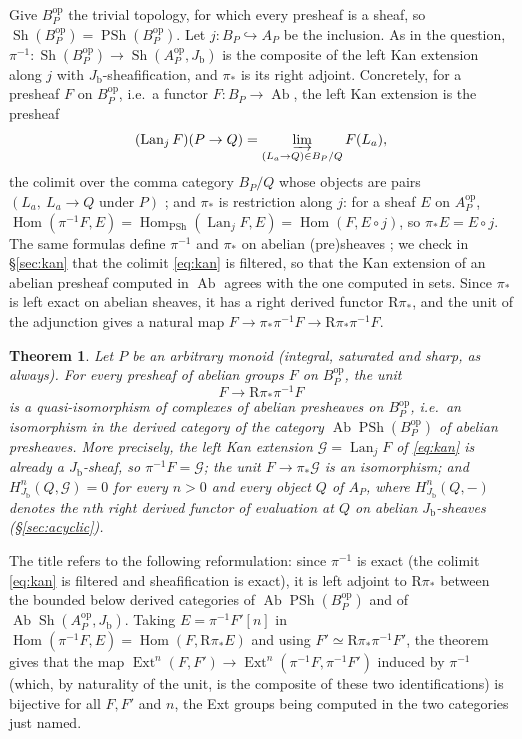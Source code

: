 \documentclass[12pt]{article}
\newcommand{\Hom}{\operatorname{Hom}}
\newcommand{\Sh}{\operatorname{Sh}}
\newcommand{\PSh}{\operatorname{PSh}}
\newcommand{\Ab}{\operatorname{Ab}}
\newcommand{\R}{\mathrm R}
\newcommand{\Jb}{J_{\mathrm b}}
\newcommand{\G}{\mathcal G}
\newcommand{\Lan}{\operatorname{Lan}}
\newtheorem{theorem}{Theorem}[section]
\theoremstyle{definition}
\theoremstyle{remark}
\begin{document}
Give \(B_P^{\mathrm{op}}\) the trivial topology, for which every presheaf is a
sheaf, so \(\Sh(B_P^{\mathrm{op}})=\PSh(B_P^{\mathrm{op}})\).  Let
\(j:B_P\hookrightarrow A_P\) be the inclusion.  As in the question,
\(\pi^{-1}:\Sh(B_P^{\mathrm{op}})\to\Sh(A_P^{\mathrm{op}},\Jb)\) is the
composite of the left Kan extension along \(j\) with \(\Jb\)-sheafification,
and \(\pi_*\) is its right adjoint.  Concretely, for a presheaf \(F\) on
\(B_P^{\mathrm{op}}\), i.e.\ a functor \(F:B_P\to\Ab\), the left Kan extension
is the presheaf
\begin{equation}
  (\Lan_jF)(P\to Q)
   =\varinjlim_{(L_a\to Q)\in B_P/Q}F(L_a),
  \label{eq:kan}
\end{equation}
the colimit over the comma category \(B_P/Q\) whose objects are pairs
\((L_a,\ L_a\to Q\text{ under }P)\) \cite[Tags 00VC, 00VE]{stacks}; and
\(\pi_*\) is restriction along \(j\): for a sheaf \(E\) on
\(A_P^{\mathrm{op}}\),
\(\Hom(\pi^{-1}F,E)=\Hom_{\PSh}(\Lan_jF,E)=\Hom(F,E\circ j)\), so
\(\pi_*E=E\circ j\).  The same formulas define \(\pi^{-1}\) and \(\pi_*\) on
abelian (pre)sheaves \cite[Tag 00VF]{stacks}; we check in \S\ref{sec:kan}
that the colimit
\eqref{eq:kan} is filtered, so that the Kan extension of an abelian presheaf
computed in \(\Ab\) agrees with the one computed in sets.  Since \(\pi_*\) is
left exact on abelian sheaves, it has a right derived functor \(\R\pi_*\),
and the unit of the adjunction gives a natural map
\(F\to\pi_*\pi^{-1}F\to\R\pi_*\pi^{-1}F\).

\begin{theorem}\label{thm:main}
Let \(P\) be an arbitrary monoid (integral, saturated and sharp, as
always).  For every presheaf of
abelian groups \(F\) on \(B_P^{\mathrm{op}}\), the unit
\[
             F\longrightarrow \R\pi_*\pi^{-1}F
\]
is a quasi-isomorphism of complexes of abelian presheaves on
\(B_P^{\mathrm{op}}\), i.e.\ an isomorphism in the derived category of
the category \(\Ab\PSh(B_P^{\mathrm{op}})\) of abelian presheaves.  More precisely, the left Kan extension
\(\G=\Lan_jF\) of \eqref{eq:kan} is already a \(\Jb\)-sheaf, so
\(\pi^{-1}F=\G\); the unit \(F\to\pi_*\G\) is an isomorphism; and
\(H^n_{\Jb}(Q,\G)=0\) for every \(n>0\) and every object \(Q\) of \(A_P\),
where \(H^n_{\Jb}(Q,-)\) denotes the \(n\)th right derived functor of
evaluation at \(Q\) on abelian \(\Jb\)-sheaves (\S\ref{sec:acyclic}).
\end{theorem}

The title refers to the following reformulation: since \(\pi^{-1}\) is
exact (the colimit \eqref{eq:kan} is filtered and sheafification is exact),
it is left adjoint to \(\R\pi_*\) between the bounded below derived
categories of \(\Ab\PSh(B_P^{\mathrm{op}})\) and of
\(\Ab\Sh(A_P^{\mathrm{op}},\Jb)\).  Taking \(E=\pi^{-1}F'[n]\) in
\(\Hom(\pi^{-1}F,E)=\Hom(F,\R\pi_*E)\) and using
\(F'\simeq\R\pi_*\pi^{-1}F'\), the theorem gives that the map
\(\operatorname{Ext}^n(F,F')\to\operatorname{Ext}^n(\pi^{-1}F,\pi^{-1}F')\)
induced by \(\pi^{-1}\) (which, by naturality of the unit, is the
composite of these two identifications) is bijective for all \(F,F'\) and
\(n\), the Ext groups being computed in the two categories just named.
\end{document}
